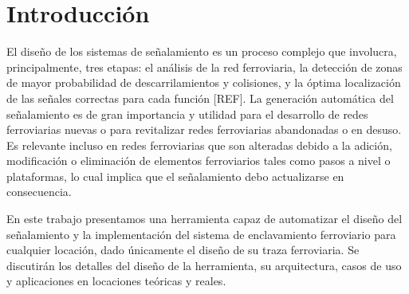 \chapter{Introducción}

    El diseño de los sistemas de señalamiento es un proceso complejo que involucra, principalmente, tres etapas: el análisis de la red ferroviaria, la detección de zonas de mayor probabilidad de descarrilamientos y colisiones, y la óptima localización de las señales correctas para cada función [REF]. La generación automática del señalamiento es de gran importancia y utilidad para el desarrollo de redes ferroviarias nuevas o para revitalizar redes ferroviarias abandonadas o en desuso. Es relevante incluso en redes ferroviarias que son alteradas debido a la adición, modificación o eliminación de elementos ferroviarios tales como pasos a nivel o plataformas, lo cual implica que el señalamiento debo actualizarse en consecuencia.
    
    En este trabajo presentamos una herramienta capaz de automatizar el diseño del señalamiento y la implementación del sistema de enclavamiento ferroviario para cualquier locación, dado únicamente el diseño de su traza ferroviaria. Se discutirán los detalles del diseño de la herramienta, su arquitectura, casos de uso y aplicaciones en locaciones teóricas y reales.



